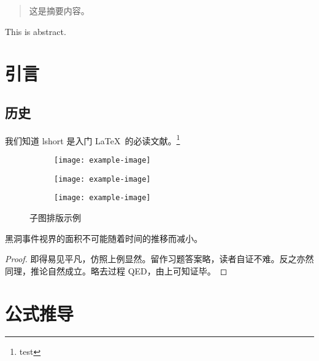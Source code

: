\documentclass[professional,final,newenv]{ncuthesis}
\begin{document}
\maketitle
\frontmatter
\makedecaut
\begin{abstract}
这是摘要内容。
\end{abstract}
\begin{abstract*}
This is abstract.
\end{abstract*}
\tableofcontents
\mainmatter
\chapter{引言}
\section{历史}
我们知道 lshort\cite{lshortcn} 是入门 \LaTeX\ 的必读文献。\footnote{test}

\begin{figure}[htb]
\centering
\begin{subfigure}{.45\textwidth}
\centering
\texttt{[image: example-image]}
\label{fig:subfigexp-a}
\end{subfigure}
\begin{subfigure}{.45\textwidth}
\centering
\texttt{[image: example-image]}
\label{fig:subfigexp-b}
\end{subfigure}
\begin{subfigure}{.45\textwidth}
\centering
\texttt{[image: example-image]}
\label{fig:subfigexp-c}
\end{subfigure}
\caption{子图排版示例}
\label{fig:subfig}
\end{figure}

\begin{law}[黑洞面积定律]
黑洞事件视界的面积不可能随着时间的推移而减小。
\end{law}
\begin{proof}
即得易见平凡，仿照上例显然。留作习题答案略，读者自证不难。反之亦然同理，推论自然成立。略去过程 QED，由上可知证毕。
\end{proof}
\appendix
\chapter{公式推导}
\end{document}
